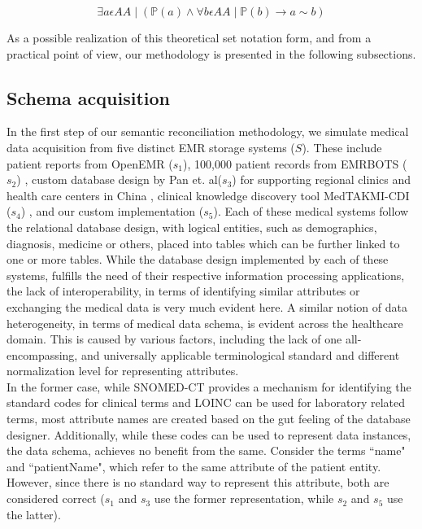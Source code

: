 \begin{equation}\label{uniqueA}
\exists a \epsilon AA \mid ( \mathbb{P}(a) \wedge \forall b \epsilon AA \mid \mathbb{P}(b) \rightarrow a \sim b)
\end{equation}


As a possible realization of this theoretical set notation form, and from a practical point of view, our methodology is presented in the following subsections.

\subsection*{Schema acquisition}
\label{schema_acq}
In the first step of our semantic reconciliation methodology, we simulate medical data acquisition from five distinct EMR storage systems ($S$). These include patient reports from OpenEMR ($s_1$), 100,000 patient records from EMRBOTS ($s_2$) \cite{kartoun2016methodology}, custom database design by Pan et. al($s_3$) for supporting regional clinics and health care centers in China \cite{pan2016design}, clinical knowledge discovery tool MedTAKMI-CDI ($s_4$) \cite{inokuchi2007medtakmi}, and our custom implementation ($s_5$). Each of these medical systems follow the relational database design, with logical entities, such as demographics, diagnosis, medicine or others, placed into tables which can be further linked to one or more tables. While the database design implemented by each of these systems, fulfills the need of their respective information processing applications, the lack of interoperability, in terms of identifying similar attributes or exchanging the medical data is very much evident here. 
A similar notion of data heterogeneity, in terms of medical data schema, is evident across the healthcare domain. This is caused by various factors, including the lack of one all-encompassing, and universally applicable terminological standard and different normalization level for representing attributes.\\
In the former case, while SNOMED-CT provides a mechanism for identifying the standard codes for clinical terms and LOINC can be used for laboratory related terms, most attribute names are created based on the gut feeling of the database designer. Additionally, while these codes can be used to represent data instances, the data schema, achieves no benefit from the same.  Consider the terms ``name" and ``patientName", which refer to the same attribute of the patient entity.  However, since there is no standard way to represent this attribute, both are considered correct ($s_1$ and $s_3$ use the former representation, while $s_2$ and $s_5$ use the latter).\\
